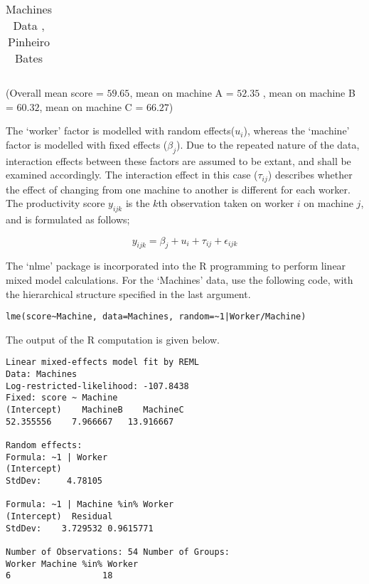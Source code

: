 \documentclass[12pt, a4paper]{report}
\theoremstyle{plain}
\theoremstyle{definition}
\theoremstyle{remark}
\begin{document}
\begin{table}[h!]
\begin{center}
\begin{tabular}{|c|c|c|c||c|c|c|c|}
			\hline
		\end{tabular}
		\caption{Machines Data , Pinheiro Bates}
	\end{center}
\end{table}
(Overall mean score = $59.65$, mean on machine A = $52.35$ , mean
on machine B = $60.32$, mean on machine C = $66.27$)


The `worker' factor is modelled with random effects($u_{i}$),
whereas the `machine' factor is modelled with fixed effects
($\beta_{j}$). Due to the repeated nature of the data, interaction
effects between these factors are assumed to be extant, and shall
be examined accordingly. The interaction effect in this case
($\tau_{ij}$) describes whether the effect of changing from one
machine to another is different for each worker. The productivity
score $y_{ijk}$ is the $k$th observation taken on worker $i$ on
machine $j$, and is formulated
as follows;

\begin{equation}
y_{ijk} = \beta_{j} + u_{i} + \tau_{ij} + \epsilon_{ijk}
\end{equation}

The `nlme' package is incorporated into the R programming to
perform linear mixed model calculations. For the `Machines' data,
\citet{pb} use the following code, with the hierarchical structure
specified in the last argument.
\begin{verbatim}
lme(score~Machine, data=Machines, random=~1|Worker/Machine)
\end{verbatim}


The output of the R computation is given below.
\begin{verbatim}
Linear mixed-effects model fit by REML
Data: Machines
Log-restricted-likelihood: -107.8438
Fixed: score ~ Machine
(Intercept)    MachineB    MachineC
52.355556    7.966667   13.916667

Random effects:
Formula: ~1 | Worker
(Intercept)
StdDev:     4.78105

Formula: ~1 | Machine %in% Worker
(Intercept)  Residual
StdDev:    3.729532 0.9615771

Number of Observations: 54 Number of Groups:
Worker Machine %in% Worker
6                  18

\end{verbatim}
\end{document}
